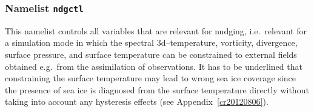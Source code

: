 \subsubsection{Namelist {\tt ndgctl}}

This namelist controls all variables that are relevant for nudging,
i.e.~relevant for a simulation mode in which the spectral
3d--temperature, vorticity, 
divergence, surface pressure, and surface temperature can be constrained
to external fields obtained e.g.~from the assimilation of
observations. It has to be underlined that constraining the surface
temperature may lead to wrong sea ice coverage since the presence of
sea ice is diagnosed from the surface temperature directly without
taking into account any hysteresis effects (see Appendix~\ref{cr20120806}).

\setlength{\LTcapwidth}{\textwidth}
\setlength{\LTleft}{0pt}\setlength{\LTright}{0pt}

